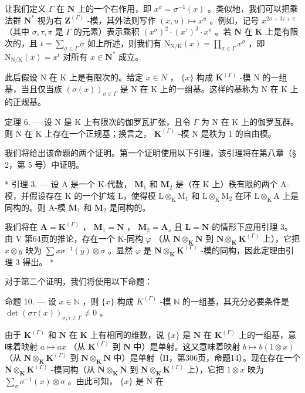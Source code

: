 让我们定义 \(\Gamma\) 在 \(\mathbf{N}\) 上的一个右作用，即 \(x^{\sigma} = \sigma^{-1}(x)\) 。类似地，我们可以把乘法群 \(\mathbf{N}^{*}\) 视为右 \(\mathbf{Z}^{(\Gamma)}\) -模，其外法则写作 \((x, u) \mapsto x^u\) 。例如，记号 \(x^{2\sigma + 3\tau + \pi}\) （其中 \(\sigma, \tau, \pi\) 是 \(\Gamma\) 的元素）表示乘积 \((x^\sigma)^2 \cdot (x^\tau)^3 \cdot x^\pi\) 。若 \(\mathbf{N}\) 在 \(\mathbf{K}\) 上是有限次的，且 \(t = \sum_{\sigma \in \Gamma} \sigma\) 如上所述，则我们有 \(\mathrm{N}_{\mathrm{N/K}}(x) = \prod_{\sigma \in \Gamma} x^\sigma\) ，即 \(\mathrm{N}_{\mathrm{N/K}}(x) = x^t\) 对所有 \(x \in \mathbf{N}^*\) 成立。

此后假设 N 在 K 上是有限次的。给定 \(x \in N\) ， \(\{x\}\) 构成 \(\mathbf{K}^{(\Gamma)}\) -模 N 的一组基，当且仅当族 \((\sigma(x))_{\sigma \in \Gamma}\) 是 N 在 K 上的一组基。这样的基称为 N 在 K 上的正规基。

定理 6. --- 设 N 是 K 上有限次的伽罗瓦扩张，且令 \(\Gamma\) 为 N 在 K 上的伽罗瓦群。则 N 在 K 上存在一个正规基；换言之， \(\mathbf{K}^{(\Gamma)}\) -模 N 是秩为 1 的自由模。

我们将给出该命题的两个证明。第一个证明使用以下引理，该引理将在第八章（§ 2，第 5 号）中证明。

* 引理 3. --- 设 A 是一个 K-代数， \(\mathbf{M}_1\) 和 \(\mathbf{M}_2\) 是（在 K 上）秩有限的两个 A-模，并假设存在 K 的一个扩域 L，使得模 \(\mathrm{L} \otimes_{\mathrm{K}} \mathrm{M}_1\) 和 \(\mathrm{L} \otimes_{\mathrm{K}} \mathrm{M}_2\) 在环 \(\mathrm{L} \otimes_{\mathrm{K}} \mathrm{A}\) 上是同构的。则 A-模 \(\mathbf{M}_1\) 和 \(\mathbf{M}_2\) 是同构的。

我们将在 \(\mathbf{A} = \mathbf{K}^{(\Gamma)}\) ， \(\mathbf{M}_1 = \mathbf{N}\) ， \(\mathbf{M}_2 = \mathbf{A}_s\) 且 \(\mathbf{L} = \mathbf{N}\) 的情形下应用引理 3。由 V 第64页的推论，存在一个 K-同构 \(\varphi\) （从 \(\mathbf{N} \otimes_{\mathbf{K}} \mathbf{N}\) 到 \(\mathbf{N} \otimes_{\mathbf{K}} \mathbf{K}^{(\Gamma)}\) 上），它把 \(x \otimes y\) 映为 \(\sum x \sigma^{-1}(y) \otimes \sigma\) 。显然 \(\varphi\) 是 \(\mathbf{N} \otimes_{\mathbf{K}} \mathbf{K}^{(\Gamma)}\) -模的同构，因此定理由引理 3 得出。 *

对于第二个证明，我们将使用以下命题：

命题 10. --- 设 \(x \in \mathbb{N}\) ，则 \(\{x\}\) 构成 \(K^{(\Gamma)}\) -模 \(\mathbb{N}\) 的一组基，其充分必要条件是 \(\det(\sigma\tau(x))_{\sigma,\tau \in \Gamma} \neq 0\) 。

由于 \(\mathbf{K}^{(\Gamma)}\) 和 \(\mathbf{N}\) 在 \(\mathbf{K}\) 上有相同的维数，说 \(\{x\}\) 是 \(\mathbf{N}\) 在 \(\mathbf{K}^{(\Gamma)}\) 上的一组基，意味着映射 \(a \mapsto ax\) （从 \(\mathbf{K}^{(\Gamma)}\) 到 \(\mathbf{N}\) 中）是单射。这又意味着映射 \(b \mapsto b(1 \otimes x)\) （从 \(\mathbf{N} \otimes_{\mathbf{K}} \mathbf{K}^{(\Gamma)}\) 到 \(\mathbf{N} \otimes_{\mathbf{K}} \mathbf{N}\) 中）是单射（II，第306页，命题14）。现在存在一个 \(\mathbf{N} \otimes_{\mathbf{K}} \mathbf{K}^{(\Gamma)}\) -模同构（从 \(\mathbf{N} \otimes_{\mathbf{K}} \mathbf{N}\) 到 \(\mathbf{N} \otimes_{\mathbf{K}} \mathbf{K}^{(\Gamma)}\) 上），它把 \(1 \otimes x\) 映为 \(\sum_{\sigma} \sigma^{-1}(x) \otimes \sigma\) 。由此可知， \(\{x\}\) 是 N 在

